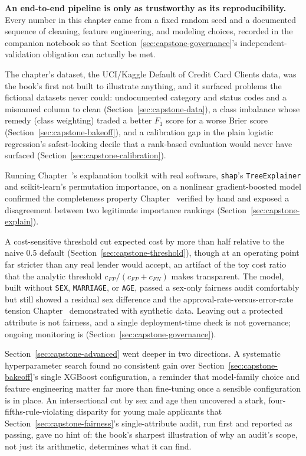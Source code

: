 \documentclass[../ai_in_finance]{subfiles}
\begin{document}
\textbf{An end-to-end pipeline is only as trustworthy as its reproducibility.} Every number in this chapter came from a fixed random seed and a documented sequence of cleaning, feature engineering, and modeling choices, recorded in the companion notebook so that Section~\ref{sec:capstone-governance}'s independent-validation obligation can actually be met.


The chapter's dataset, the UCI/Kaggle Default of Credit Card Clients data, was the book's first not built to illustrate anything, and it surfaced problems the fictional datasets never could: undocumented category and status codes and a misnamed column to clean (Section~\ref{sec:capstone-data}), a class imbalance whose remedy (class weighting) traded a better $F_1$ score for a worse Brier score (Section~\ref{sec:capstone-bakeoff}), and a calibration gap in the plain logistic regression's safest-looking decile that a rank-based evaluation would never have surfaced (Section~\ref{sec:capstone-calibration}).

Running Chapter~'s explanation toolkit with real software, \texttt{shap}'s \texttt{TreeExplainer} and scikit-learn's permutation importance, on a nonlinear gradient-boosted model confirmed the completeness property Chapter~ verified by hand and exposed a disagreement between two legitimate importance rankings (Section~\ref{sec:capstone-explain}).

A cost-sensitive threshold cut expected cost by more than half relative to the naive 0.5 default (Section~\ref{sec:capstone-threshold}), though at an operating point far stricter than any real lender would accept, an artifact of the toy cost ratio that the analytic threshold $c_{FP}/(c_{FP}+c_{FN})$ makes transparent. The model, built without \texttt{SEX}, \texttt{MARRIAGE}, or \texttt{AGE}, passed a sex-only fairness audit comfortably but still showed a residual sex difference and the approval-rate-versus-error-rate tension Chapter~ demonstrated with synthetic data. Leaving out a protected attribute is not fairness, and a single deployment-time check is not governance; ongoing monitoring is (Section~\ref{sec:capstone-governance}).

Section~\ref{sec:capstone-advanced} went deeper in two directions. A systematic hyperparameter search found no consistent gain over Section~\ref{sec:capstone-bakeoff}'s single XGBoost configuration, a reminder that model-family choice and feature engineering matter far more than fine-tuning once a sensible configuration is in place. An intersectional cut by sex and age then uncovered a stark, four-fifths-rule-violating disparity for young male applicants that Section~\ref{sec:capstone-fairness}'s single-attribute audit, run first and reported as passing, gave no hint of: the book's sharpest illustration of why an audit's scope, not just its arithmetic, determines what it can find.
\end{document}
